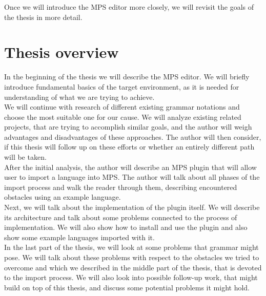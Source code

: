 Once we will introduce the MPS editor more closely, we will revisit the goals of the thesis in more detail.

\section{Thesis overview}

In the beginning of the thesis we will describe the MPS editor.
We will briefly introduce fundamental basics of the target environment, as it is needed for understanding of what we are trying to achieve.
\\

We will continue with research of different existing grammar notations and choose the most suitable one for our cause.
We will analyze existing related projects, that are trying to accomplish similar goals, and the author will weigh advantages and disadvantages of these approaches.
The author will then consider, if this thesis will follow up on these efforts or whether an entirely different path will be taken.
\\

After the initial analysis, the author will describe an MPS plugin that will allow user to import a language into MPS.
The author will talk about all phases of the import process and walk the reader through them, describing encountered obstacles using an example language.
\\

Next, we will talk about the implementation of the plugin itself.
We will describe its architecture and talk about some problems connected to the process of implementation.
We will also show how to install and use the plugin and also show some example languages imported with it.
\\

In the last part of the thesis, we will look at some problems that grammar might pose.
We will talk about these problems with respect to the obstacles we tried to overcome and which we described in the middle part of the thesis, that is devoted to the import process.
We will also look into possible follow-up work, that might build on top of this thesis, and discuss some potential problems it might hold.
